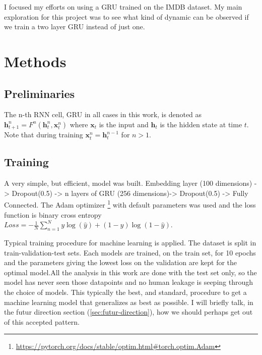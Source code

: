 \documentclass{article}
\begin{document}
I focused my efforts on using a GRU trained on the IMDB dataset. My main exploration for this project was to see what kind of dynamic can be observed if we train a two layer GRU instead of just one.

\section{Methods}

\subsection{Preliminaries}
\label{sec:method-preliminaries}
The n-th RNN cell, GRU in all cases in this work, is denoted as $\textbf{h}_{t+1}^{n}=F^{n}(\textbf{h}_t^{n}, \textbf{x}_t^{n})$ where $\textbf{x}_t$ is the input and  $\textbf{h}_t$ is the hidden state at time $t$. Note that during training $\textbf{x}_t^{n} = \textbf{h}_t^{n-1}$ for  $n > 1$. 


\subsection{Training}
A very simple, but efficient, model was built. Embedding layer (100 dimensions) -> Dropout(0.5) -> n layers of GRU (256 dimensions)-> Dropout(0.5) -> Fully Connected. The Adam optimizer \footnote{\url{https://pytorch.org/docs/stable/optim.html\#torch.optim.Adam}} with default parameters was used and the loss function is binary cross entropy $Loss=-\frac{1}{N}\sum_{n=1}^{N} y\log\left( \hat{y} \right) + \left( 1-y \right) \log\left( 1-\hat{y} \right)$.

Typical training procedure for machine learning is applied. The dataset is split in train-validation-test sets. Each models are trained, on the train set, for 10 epochs and the parameters giving the lowest loss on the validation are kept for the optimal model.All the analysis in this work are done with the test set only, so the model has never seen those datapoints and no human leakage is seeping through the choice of models. This typically the best, and standard, procedure to get a machine learning model that generalizes as best as possible. I will briefly talk, in the futur direction section (\ref{sec:futur-direction}), how we should perhaps get out of this accepted pattern.
\end{document}
